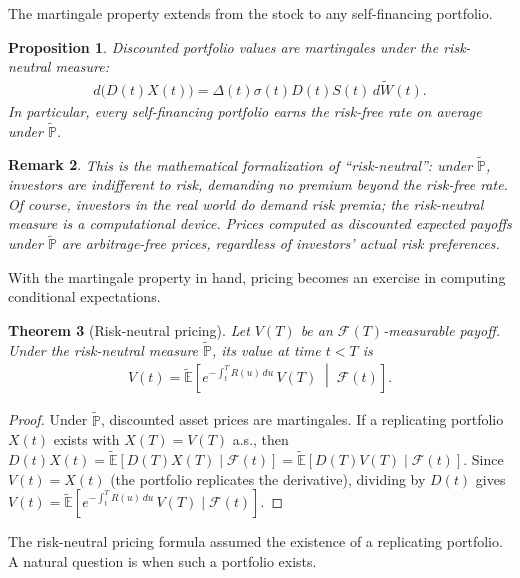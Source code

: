 \documentclass{report}
\theoremstyle{spacedplain}
\newtheorem{theorem}{Theorem}[section]
\newtheorem{proposition}[theorem]{Proposition}
\theoremstyle{spaceddefinition}
\theoremstyle{spacedremark}
\newtheorem{remark}[theorem]{Remark}
\begin{document}
The martingale property extends from the stock to any self-financing portfolio.

\begin{proposition}
Discounted portfolio values are martingales under the risk-neutral measure:
\begin{align}
    d\bigl(D(t)X(t)\bigr) = \Delta(t)\sigma(t)D(t)S(t)\,d\widetilde{W}(t).
\end{align}
In particular, every self-financing portfolio earns the risk-free rate on average under $\widetilde{\mathbb{P}}$.
\end{proposition}

\begin{remark}
This is the mathematical formalization of ``risk-neutral'': under $\widetilde{\mathbb{P}}$, investors are indifferent to risk, demanding no premium beyond the risk-free rate. Of course, investors in the real world do demand risk premia; the risk-neutral measure is a computational device. Prices computed as discounted expected payoffs under $\widetilde{\mathbb{P}}$ are arbitrage-free prices, regardless of investors' actual risk preferences.
\end{remark}

With the martingale property in hand, pricing becomes an exercise in computing conditional expectations.

\begin{theorem}[Risk-neutral pricing]
Let $V(T)$ be an $\mathcal{F}(T)$-measurable payoff. Under the risk-neutral measure $\widetilde{\mathbb{P}}$, its value at time $t < T$ is
\begin{align}
    V(t) = \widetilde{\mathbb{E}}\!\left[e^{-\int_t^T R(u)\,du}\,V(T)\;\middle|\;\mathcal{F}(t)\right].
\end{align}
\end{theorem}

\begin{proof}
Under $\widetilde{\mathbb{P}}$, discounted asset prices are martingales. If a replicating portfolio $X(t)$ exists with $X(T) = V(T)$ a.s., then $D(t)X(t) = \widetilde{\mathbb{E}}[D(T)X(T) \mid \mathcal{F}(t)] = \widetilde{\mathbb{E}}[D(T)V(T) \mid \mathcal{F}(t)]$. Since $V(t) = X(t)$ (the portfolio replicates the derivative), dividing by $D(t)$ gives $V(t) = \widetilde{\mathbb{E}}[e^{-\int_t^T R(u)\,du}\,V(T) \mid \mathcal{F}(t)]$.
\end{proof}

The risk-neutral pricing formula assumed the existence of a replicating portfolio. A natural question is when such a portfolio exists.
\end{document}
